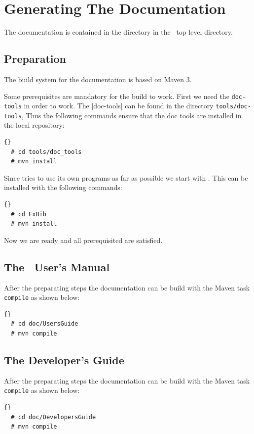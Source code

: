 \INCOMPLETE


\section{Generating The Documentation}

The documentation is contained in the directory  in the
\ExTeX\ top level directory.

\subsection{Preparation}

The build system for the documentation is based on Maven 3.

Some prerequisites are mandatory for the build to work. First we need
the \verb|doc-tools| in order to work. The
|doc-tools| can be found in the directory \verb|tools/doc-tools|, Thus
the following commands ensure that the doc tools are installed in the
local repository:

\begin{lstlisting}{}
  # cd tools/doc_tools
  # mvn install
\end{lstlisting}

Since \ExBib\index{\ExBib@ExBib} tries to use its own programs as far
as possible we start with \ExBib. This can be installed with the
following commands:

\begin{lstlisting}{}
  # cd ExBib
  # mvn install
\end{lstlisting}

Now we are ready and all prerequisited are satisfied.


\subsection{The \ExTeX\ User's Manual}

After the preparating steps the documentation can be build with the
Maven task \texttt{compile} as shown below:

\begin{lstlisting}{}
  # cd doc/UsersGuide
  # mvn compile
\end{lstlisting}

\subsection{The Developer's Guide}

After the preparating steps the documentation can be build with the
Maven task \texttt{compile} as shown below:

\begin{lstlisting}{}
  # cd doc/DevelopersGuide
  # mvn compile
\end{lstlisting}

